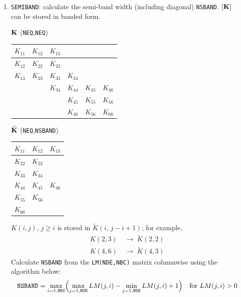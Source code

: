 \begin{enumerate}[leftmargin=*]
  \item \texttt{SEMIBAND}: calculate the semi-band width (including diagonal) \texttt{NSBAND}. $[\mathbf{K}]$ can be stored in banded form.
    \begin{center}
      \begin{minipage}{0.5\linewidth}\centering
        $\mathbf{K}$ (\texttt{NEQ},\texttt{NEQ})\\[4pt]
        \renewcommand{\arraystretch}{1.3}
        \begin{tabular}{|c|c|c|c|c|c|}\hline
          $K_{11}$ & $K_{12}$ & $K_{13}$ &          &          &         \\\hline
          $K_{12}$ & $K_{22}$ & $K_{23}$ &          &          &         \\\hline
          $K_{13}$ & $K_{23}$ & $K_{33}$ & $K_{34}$ &          &         \\\hline
                   &          & $K_{34}$ & $K_{44}$ & $K_{45}$ & $K_{46}$\\\hline
                   &          &          & $K_{45}$ & $K_{55}$ & $K_{56}$\\\hline
                   &          &          & $K_{46}$ & $K_{56}$ & $K_{66}$\\\hline
        \end{tabular}
      \end{minipage}
      \begin{minipage}{0.42\linewidth}\centering
        $\widetilde{\mathbf{K}}$ (\texttt{NEQ},\texttt{NSBAND})\\[4pt]
        \renewcommand{\arraystretch}{1.3}
        \begin{tabular}{|c|c|c|}\hline
          $K_{11}$ & $K_{12}$ & $K_{13}$\\\hline
          $K_{22}$ & $K_{23}$ &         \\\hline
          $K_{33}$ & $K_{34}$ &         \\\hline
          $K_{44}$ & $K_{45}$ & $K_{46}$\\\hline
          $K_{55}$ & $K_{56}$ &         \\\hline
          $K_{66}$ &          &         \\\hline
        \end{tabular}
      \end{minipage}
    \end{center}
    $K(i,j)$, $j\geq i$ is stored in $\widetilde{K}(i,\,j-i+1)$; for example,
    \begin{align*}
      K(2,3) &\;\rightarrow\; \widetilde{K}(2,2)\\
      K(4,6) &\;\rightarrow\; \widetilde{K}(4,3)
    \end{align*}
    Calculate \texttt{NSBAND} from the \texttt{LM(NDE,NBC)} matrix columnwise using the algorithm below:
    \begin{equation}
      \texttt{NSBAND} = \max_{i=1,\texttt{NBC}}\Bigl(\max_{j=1,\texttt{NDE}}LM(j,i) - \min_{j=1,\texttt{NDE}}LM(j,i) + 1\Bigr)\quad\text{for } LM(j,i) > 0
    \end{equation}
\end{enumerate}

